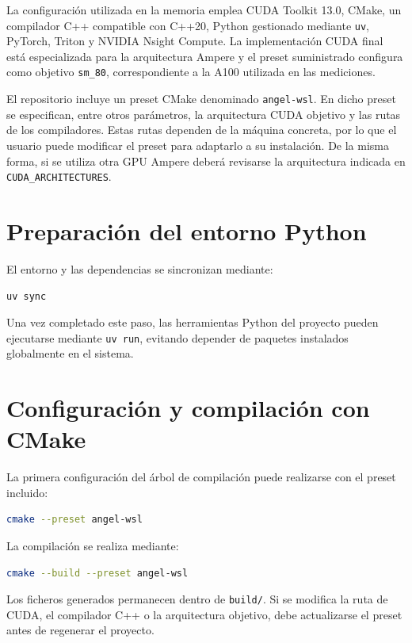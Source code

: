 La configuración utilizada en la memoria emplea CUDA Toolkit 13.0, CMake, un compilador C++ compatible con C++20, Python gestionado mediante \texttt{uv}, PyTorch, Triton y NVIDIA Nsight Compute. La implementación CUDA final está especializada para la arquitectura Ampere y el preset suministrado configura como objetivo \texttt{sm\_80}, correspondiente a la A100 utilizada en las mediciones.

El repositorio incluye un preset CMake denominado \texttt{angel-wsl}. En dicho preset se especifican, entre otros parámetros, la arquitectura CUDA objetivo y las rutas de los compiladores. Estas rutas dependen de la máquina concreta, por lo que el usuario puede modificar el preset para adaptarlo a su instalación. De la misma forma, si se utiliza otra GPU Ampere deberá revisarse la arquitectura indicada en \texttt{CUDA\_ARCHITECTURES}.

\section{Preparación del entorno Python}

El entorno y las dependencias se sincronizan mediante:

\begin{lstlisting}[language=bash]
uv sync
\end{lstlisting}

Una vez completado este paso, las herramientas Python del proyecto pueden ejecutarse mediante \texttt{uv run}, evitando depender de paquetes instalados globalmente en el sistema.

\section{Configuración y compilación con CMake}

La primera configuración del árbol de compilación puede realizarse con el preset incluido:

\begin{lstlisting}[language=bash]
cmake --preset angel-wsl
\end{lstlisting}

La compilación se realiza mediante:

\begin{lstlisting}[language=bash]
cmake --build --preset angel-wsl
\end{lstlisting}

Los ficheros generados permanecen dentro de \texttt{build/}. Si se modifica la ruta de CUDA, el compilador C++ o la arquitectura objetivo, debe actualizarse el preset antes de regenerar el proyecto.

